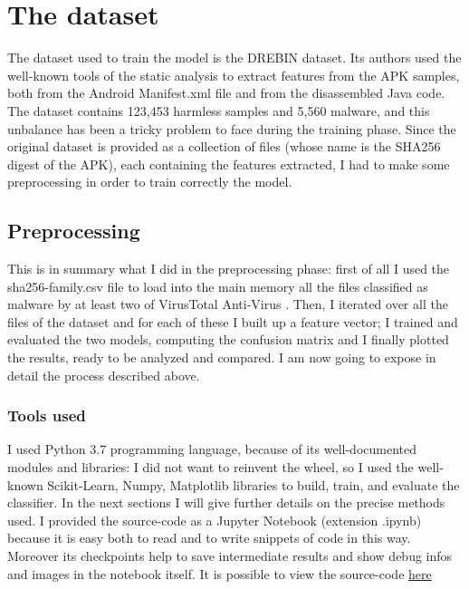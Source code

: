 \documentclass[12pt]{article}
\begin{document}
\section{The dataset}
The dataset used to train the model is the DREBIN dataset. Its authors used the well-known tools of the static analysis to extract features from the APK samples, both from the Android Manifest.xml file and from the disassembled Java code. The dataset contains 123,453 harmless samples and 5,560 malware, and this unbalance has been a tricky problem to face during the training phase. Since the original dataset is provided as a collection of files (whose name is the SHA256 digest of the APK), each containing the features extracted, I had to make some preprocessing in order to train correctly the model. 

\subsection{Preprocessing}
This is in summary what I did in the preprocessing phase: first of all I used the sha256-family.csv file to load into the main memory all the files classified as malware by at least two of VirusTotal Anti-Virus \cite{DREBIN}. Then, I iterated over all the files of the dataset and for each of these I built up a feature vector; I trained and evaluated the two models, computing the confusion matrix and I finally plotted the results, ready to be analyzed and compared. I am now going to expose in detail the process described above. 

\subsubsection{Tools used}
I used Python 3.7 programming language, because of its well-documented modules and libraries: I did not want to reinvent the wheel, so I used the well-known Scikit-Learn, Numpy, Matplotlib libraries to build, train, and evaluate the classifier. In the next sections I will give further details on the precise methods used.
I provided the source-code as a Jupyter Notebook (extension .ipynb) because it is easy both to read and to write snippets of code in this way. Moreover its checkpoints help to save intermediate results and show debug infos and images in the notebook itself. It is possible to view the source-code \href{https://www.gitlab.com/lrusso96/machine-learning}{here} 
\end{document}

